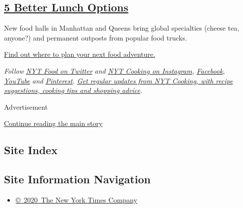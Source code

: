 \hypertarget{5-better-lunch-options}{%
\subsection{\texorpdfstring{\href{https://www.nytimes3xbfgragh.onion/2019/09/03/dining/food-halls-nyc.html}{5
Better Lunch
Options}}{5 Better Lunch Options}}\label{5-better-lunch-options}}

New food halls in Manhattan and Queens bring global specialties (cheese
tea, anyone?) and permanent outposts from popular food trucks.

\href{https://www.nytimes3xbfgragh.onion/2019/09/03/dining/food-halls-nyc.html}{Find
out where to plan your next food adventure.}

\emph{Follow} \href{https://twitter.com/nytfood}{\emph{NYT Food on
Twitter}} \emph{and}
\href{https://www.instagram.com/nytcooking/}{\emph{NYT Cooking on
Instagram}}\emph{,}
\href{https://www.facebookcorewwwi.onion/nytcooking/}{\emph{Facebook}}\emph{,}
\href{https://www.youtube.com/nytcooking}{\emph{YouTube}} \emph{and}
\href{https://www.pinterest.com/nytcooking/}{\emph{Pinterest}}\emph{.}
\href{https://www.nytimes3xbfgragh.onion/newsletters/cooking}{\emph{Get
regular updates from NYT Cooking, with recipe suggestions, cooking tips
and shopping advice}}\emph{.}

Advertisement

\protect\hyperlink{after-bottom}{Continue reading the main story}

\hypertarget{site-index}{%
\subsection{Site Index}\label{site-index}}

\hypertarget{site-information-navigation}{%
\subsection{Site Information
Navigation}\label{site-information-navigation}}

\begin{itemize}
\tightlist
\item
  \href{https://help.nytimes3xbfgragh.onion/hc/en-us/articles/115014792127-Copyright-notice}{©~2020~The
  New York Times Company}
\end{itemize}

